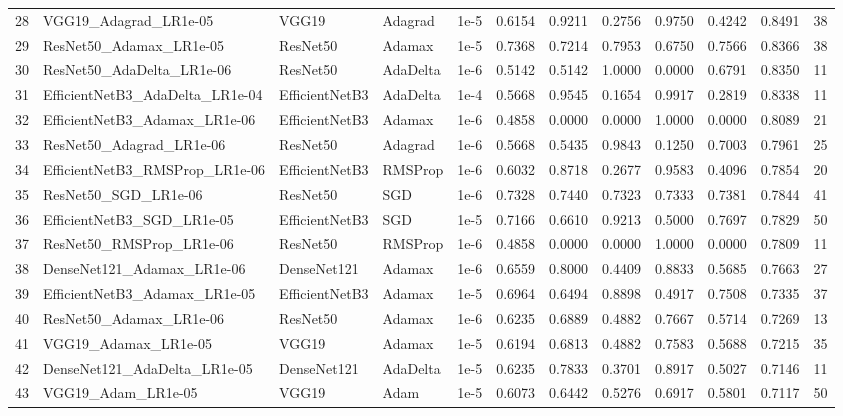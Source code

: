 \begin{longtable}{r l l l r r r r r r r r}
   28 & VGG19\_Adagrad\_LR1e-05   & VGG19 & Adagrad & 1e-5 & 0.6154 & 0.9211 & 0.2756 & 0.9750 & 0.4242 & 0.8491 & 38 \\
   29 & ResNet50\_Adamax\_LR1e-05 & ResNet50 & Adamax & 1e-5 & 0.7368 & 0.7214 & 0.7953 & 0.6750 & 0.7566 & 0.8366 & 38 \\
   30 & ResNet50\_AdaDelta\_LR1e-06 & ResNet50 & AdaDelta & 1e-6 & 0.5142 & 0.5142 & 1.0000 & 0.0000 & 0.6791 & 0.8350 & 11 \\
   31 & EfficientNetB3\_AdaDelta\_LR1e-04 & EfficientNetB3 & AdaDelta & 1e-4 & 0.5668 & 0.9545 & 0.1654 & 0.9917 & 0.2819 & 0.8338 & 11 \\
   32 & EfficientNetB3\_Adamax\_LR1e-06 & EfficientNetB3 & Adamax & 1e-6 & 0.4858 & 0.0000 & 0.0000 & 1.0000 & 0.0000 & 0.8089 & 21 \\
   33 & ResNet50\_Adagrad\_LR1e-06 & ResNet50 & Adagrad & 1e-6 & 0.5668 & 0.5435 & 0.9843 & 0.1250 & 0.7003 & 0.7961 & 25 \\
   34 & EfficientNetB3\_RMSProp\_LR1e-06 & EfficientNetB3 & RMSProp & 1e-6 & 0.6032 & 0.8718 & 0.2677 & 0.9583 & 0.4096 & 0.7854 & 20 \\
   35 & ResNet50\_SGD\_LR1e-06    & ResNet50 & SGD & 1e-6 & 0.7328 & 0.7440 & 0.7323 & 0.7333 & 0.7381 & 0.7844 & 41 \\
   36 & EfficientNetB3\_SGD\_LR1e-05 & EfficientNetB3 & SGD & 1e-5 & 0.7166 & 0.6610 & 0.9213 & 0.5000 & 0.7697 & 0.7829 & 50 \\
   37 & ResNet50\_RMSProp\_LR1e-06 & ResNet50 & RMSProp & 1e-6 & 0.4858 & 0.0000 & 0.0000 & 1.0000 & 0.0000 & 0.7809 & 11 \\
   38 & DenseNet121\_Adamax\_LR1e-06 & DenseNet121 & Adamax & 1e-6 & 0.6559 & 0.8000 & 0.4409 & 0.8833 & 0.5685 & 0.7663 & 27 \\
   39 & EfficientNetB3\_Adamax\_LR1e-05 & EfficientNetB3 & Adamax & 1e-5 & 0.6964 & 0.6494 & 0.8898 & 0.4917 & 0.7508 & 0.7335 & 37 \\
   40 & ResNet50\_Adamax\_LR1e-06 & ResNet50 & Adamax & 1e-6 & 0.6235 & 0.6889 & 0.4882 & 0.7667 & 0.5714 & 0.7269 & 13 \\
   41 & VGG19\_Adamax\_LR1e-05    & VGG19 & Adamax & 1e-5 & 0.6194 & 0.6813 & 0.4882 & 0.7583 & 0.5688 & 0.7215 & 35 \\
   42 & DenseNet121\_AdaDelta\_LR1e-05 & DenseNet121 & AdaDelta & 1e-5 & 0.6235 & 0.7833 & 0.3701 & 0.8917 & 0.5027 & 0.7146 & 11 \\
   43 & VGG19\_Adam\_LR1e-05      & VGG19 & Adam & 1e-5 & 0.6073 & 0.6442 & 0.5276 & 0.6917 & 0.5801 & 0.7117 & 50 \\

\end{longtable}
